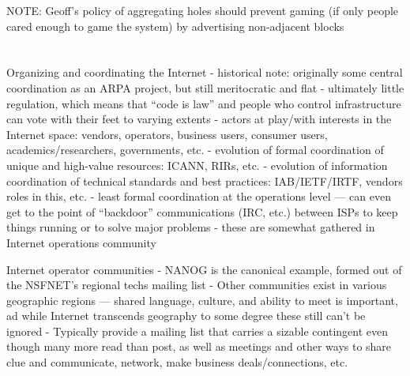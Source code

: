 NOTE: Geoff's policy of aggregating holes should prevent gaming (if only people cared enough to game the system) by advertising non-adjacent blocks

% 

\section{}

Organizing and coordinating the Internet
       - historical note: originally some central coordination as an
         ARPA project, but still meritocratic and flat
       - ultimately little regulation, which means that ``code is law''
         and people who control infrastructure can vote with their
         feet to varying extents
       - actors at play/with interests in the Internet space: vendors,
         operators, business users, consumer users,
         academics/researchers, governments, etc.
       - evolution of formal coordination of unique and high-value
         resources: ICANN, RIRs, etc.
       - evolution of information coordination of technical standards
         and best practices: IAB/IETF/IRTF, vendors roles in this, etc.
       - least formal coordination at the operations level — can even
         get to the point of ``backdoor'' communications (IRC, etc.)
         between ISPs to keep things running or to solve major problems
       - these are somewhat gathered in Internet operations community

Internet operator communities
       - NANOG is the canonical example, formed out of the NSFNET's
         regional techs mailing list
       - Other communities exist in various geographic regions —
         shared language, culture, and ability to meet is important,
         ad while Internet transcends geography to some degree these
         still can't be ignored
       - Typically provide a mailing list that carries a sizable
         contingent even though many more read than post, as well as
         meetings and other ways to share clue and communicate,
         network, make business deals/connections, etc.
